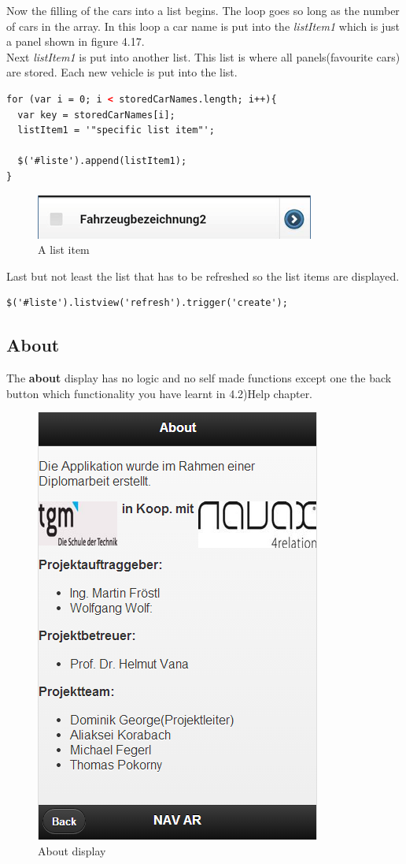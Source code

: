 Now the filling of the cars into a list begins. The loop goes so long as the number of cars in the array. In this loop a car name is put into the \textit{listItem1} which is just a panel shown in figure 4.17.
\\

Next \textit{listItem1} is put into another list. This list is where all panels(favourite cars) are stored. Each new vehicle is put into the list.
\\
\begin{lstlisting}[language=html, caption= 
Adding list items into the list,captionpos=b]
for (var i = 0; i < storedCarNames.length; i++){
  var key = storedCarNames[i];
  listItem1 = '"specific list item"';

  $('#liste').append(listItem1);
}
\end{lstlisting}

\begin{figure}[h]
\centering
\includegraphics[width=0.7\linewidth]{graphics/chapter4/16}
\caption{A list item}
\end{figure}

Last but not least the list that has to be refreshed so the list items are displayed. 
\\

\begin{lstlisting}[language=html, caption= 
Refreshing the list,captionpos=b]
$('#liste').listview('refresh').trigger('create'); 
\end{lstlisting}


\subsection{About}
The \textbf{about} display has no logic and no self made functions except one the back button which functionality you have learnt in 4.2)Help chapter.
\\
\begin{figure}[h]
\centering
\includegraphics[width=0.4\linewidth]{graphics/chapter4/17}
\caption{About display}
\end{figure}
\newpage


